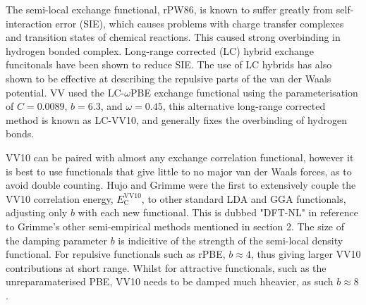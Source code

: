 \documentclass[10pt,a4paper,twocolumn,twoside]{extarticle}
\begin{document}
	The semi-local exchange functional, rPW86, is known to suffer greatly from self-interaction error (SIE), which causes problems with charge transfer complexes and transition states of chemical reactions. This caused strong overbinding in hydrogen bonded complex.\cite{Vydrov2012} Long-range corrected (LC) hybrid exchange funcitonals have been shown to reduce SIE. \cite{vydrov2006-LC-Hybrids} The use of LC hybrids has also shown to be effective at describing the repulsive parts of the van der Waals potential. \cite{sato2007-LC-Hybrids} VV used the LC-$\omega$PBE exchange functional using the parameterisation of $C = 0.0089$, $b = 6.3$, and $\omega = 0.45$, this alternative long-range corrected method is known as LC-VV10, and generally fixes the overbinding of hydrogen bonds.

	VV10 can be paired with almost any exchange correlation functional, however it is best to use functionals that give little to no major van der Waals forces, as to avoid double counting.
	Hujo and Grimme were the first to extensively couple the VV10 correlation energy, $E_\text{C}^\text{VV10}$, to other standard LDA and GGA functionals, adjusting only $b$ with each new functional.\cite{Grimme2011-VV10-LDA-GGA-Pairing} This is dubbed "DFT-NL" in reference to Grimme's other semi-empirical methods mentioned in section 2. The size of the damping parameter $b$ is indicitive of the strength of the semi-local density functional. For repulsive functionals such as rPBE, $b \approx 4$, thus giving larger VV10 contributions at short range. Whilst for attractive functionals, such as the unreparamaterised PBE, VV10 needs to be damped much hheavier, as such $b \approx 8$.\cite{Grimme2011}
	
\end{document}
